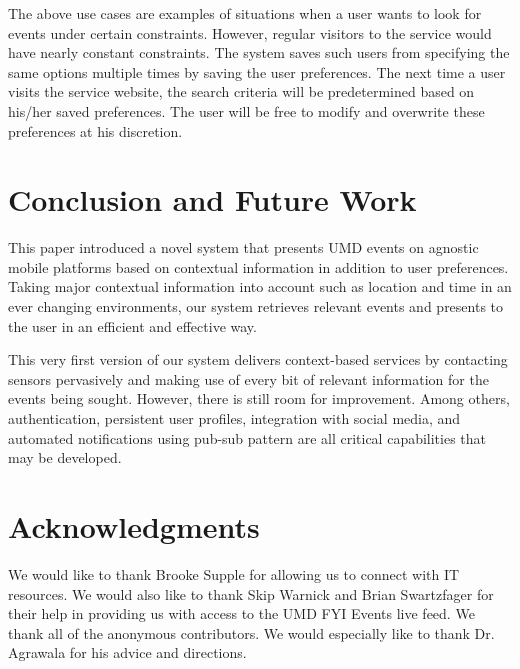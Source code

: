 \documentclass{acm_proc_article-sp}
\begin{document}
The above use cases are examples of situations when a user wants to look for events under certain constraints. However, regular visitors to the service would have nearly constant constraints. The system saves such users from specifying the same options multiple times by saving the user preferences. The next time a user visits the service website, the search criteria will be predetermined based on his/her saved preferences. The user will be free to modify and overwrite these preferences at his discretion.

 
\section{Conclusion and Future Work}
This paper introduced a novel system that presents UMD events on agnostic mobile platforms based on contextual information in addition to user preferences. Taking major contextual information into account such as location and time in an ever changing environments, our system retrieves relevant events and presents to the user in an efficient and effective way.

This very first version of our system delivers context-based services by contacting sensors pervasively and making use of every bit of relevant information for the events being sought. However, there is still room for improvement. Among others, authentication, persistent user profiles, integration with social media, and automated notifications using pub-sub pattern are all critical capabilities that may be developed.  

\section{Acknowledgments}
We would like to thank Brooke Supple for allowing us to connect with IT resources. We would also like to thank Skip Warnick and Brian Swartzfage​r for their help in providing us with access to the UMD FYI Events live feed. We thank all of the anonymous contributors. We would especially like to thank Dr. Agrawala for his advice and directions.

%

%
%
\balancecolumns
\end{document}
